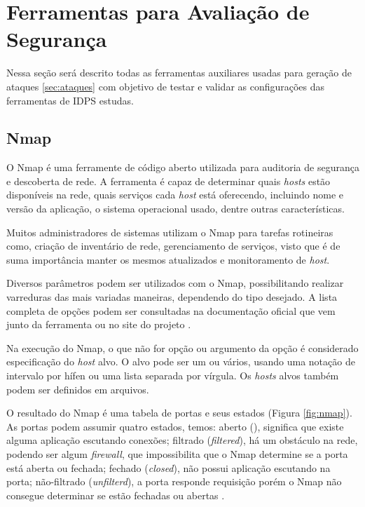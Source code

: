 \documentclass[
	12pt,				
	openright,		
	twoside,	
	a4paper,
	english,	
	brazil	
	]{abntex2}
\begin{document}
 \section{Ferramentas para Avaliação de Segurança} \label{sec:ferramentas}

 Nessa seção será descrito todas as ferramentas auxiliares usadas para geração de ataques \ref{sec:ataques} com objetivo de testar e validar as configurações das ferramentas de IDPS estudas. 

 \subsection{Nmap} \label{sec:nmap}

 O Nmap é uma ferramente de código aberto utilizada para auditoria de segurança e descoberta de rede. A ferramenta é capaz de determinar quais \textit{hosts} estão disponíveis na rede, quais serviços cada \textit{host} está oferecendo, incluindo nome e versão da aplicação, o sistema operacional usado, dentre outras características.  

 Muitos administradores de sistemas utilizam o Nmap para tarefas rotineiras como, criação de inventário de rede, gerenciamento de serviços, visto que é de suma importância manter os mesmos atualizados e monitoramento de \textit{host}.

 Diversos parâmetros podem ser utilizados com o Nmap, possibilitando realizar varreduras das mais variadas maneiras, dependendo do tipo desejado. A lista completa de opções podem ser consultadas na documentação oficial que vem junto da ferramenta ou no site do projeto \cite{nmap}. 

 Na execução do Nmap, o que não for opção ou argumento da opção é considerado especificação do \textit{host} alvo. O alvo pode ser um ou vários, usando uma notação de intervalo por hífen ou uma lista separada por vírgula. Os \textit{hosts} alvos também podem ser definidos em arquivos.

 O resultado do Nmap é uma tabela de portas e seus estados (Figura \ref{fig:nmap}). As portas podem assumir quatro estados, temos: aberto (), significa que existe alguma aplicação escutando conexões; filtrado (\textit{filtered}), há um obstáculo na rede, podendo ser algum \textit{firewall}, que impossibilita que o Nmap determine se a porta está aberta ou fechada; fechado (\textit{closed}), não possui aplicação escutando na porta; não-filtrado (\textit{unfilterd}), a porta responde requisição porém o Nmap não consegue determinar se estão fechadas ou abertas \cite{nmap}.
\end{document}
